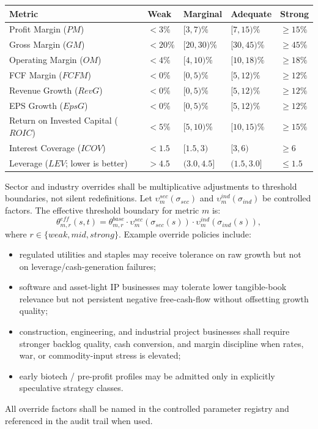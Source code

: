 \documentclass[11pt]{report}
\begin{document}
\renewcommand{\arraystretch}{1.12}
\begin{longtable}{p{}p{}p{}p{}p{}}
\toprule
Metric & Weak & Marginal & Adequate & Strong \\
\midrule
Profit Margin ($PM$) & $<3\%$ & $[3,7)\%$ & $[7,15)\%$ & $\ge 15\%$ \\
Gross Margin ($GM$) & $<20\%$ & $[20,30)\%$ & $[30,45)\%$ & $\ge 45\%$ \\
Operating Margin ($OM$) & $<4\%$ & $[4,10)\%$ & $[10,18)\%$ & $\ge 18\%$ \\
FCF Margin ($FCFM$) & $<0\%$ & $[0,5)\%$ & $[5,12)\%$ & $\ge 12\%$ \\
Revenue Growth ($RevG$) & $<0\%$ & $[0,5)\%$ & $[5,12)\%$ & $\ge 12\%$ \\
EPS Growth ($EpsG$) & $<0\%$ & $[0,5)\%$ & $[5,12)\%$ & $\ge 12\%$ \\
Return on Invested Capital ($ROIC$) & $<5\%$ & $[5,10)\%$ & $[10,15)\%$ & $\ge 15\%$ \\
Interest Coverage ($ICOV$) & $<1.5$ & $[1.5,3)$ & $[3,6)$ & $\ge 6$ \\
Leverage ($LEV$; lower is better) & $>4.5$ & $(3.0,4.5]$ & $(1.5,3.0]$ & $\le 1.5$ \\
\bottomrule
\end{longtable}

Sector and industry overrides shall be multiplicative adjustments to threshold boundaries, not silent redefinitions. Let $\upsilon_m^{sec}(\sigma_{sec})$ and $\upsilon_m^{ind}(\sigma_{ind})$ be controlled factors. The effective threshold boundary for metric $m$ is:
\[
\theta^{eff}_{m,r}(s,t)=\theta_{m,r}^{base}\cdot \upsilon_m^{sec}(\sigma_{sec}(s))\cdot \upsilon_m^{ind}(\sigma_{ind}(s)),
\]
where $r\in\{weak,mid,strong\}$. Example override policies include:
\begin{itemize}
    \item regulated utilities and staples may receive tolerance on raw growth but not on leverage/cash-generation failures;
    \item software and asset-light IP businesses may tolerate lower tangible-book relevance but not persistent negative free-cash-flow without offsetting growth quality;
    \item construction, engineering, and industrial project businesses shall require stronger backlog quality, cash conversion, and margin discipline when rates, war, or commodity-input stress is elevated;
    \item early biotech / pre-profit profiles may be admitted only in explicitly speculative strategy classes.
\end{itemize}
All override factors shall be named in the controlled parameter registry and referenced in the audit trail when used.
\end{document}
